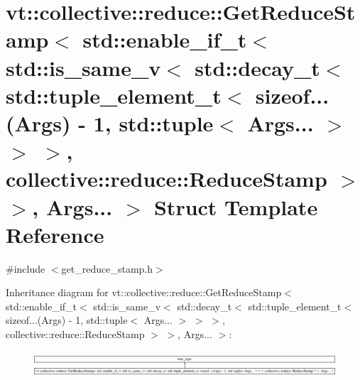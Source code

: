 \hypertarget{structvt_1_1collective_1_1reduce_1_1_get_reduce_stamp_3_01std_1_1enable__if__t_3_01std_1_1is__sa2cf8316b2e34c0a2685c4cd088c88737}{}\section{vt\+:\+:collective\+:\+:reduce\+:\+:Get\+Reduce\+Stamp$<$ std\+:\+:enable\+\_\+if\+\_\+t$<$ std\+:\+:is\+\_\+same\+\_\+v$<$ std\+:\+:decay\+\_\+t$<$ std\+:\+:tuple\+\_\+element\+\_\+t$<$ sizeof...(Args) -\/ 1, std\+:\+:tuple$<$ Args... $>$ $>$ $>$, collective\+:\+:reduce\+:\+:Reduce\+Stamp $>$ $>$, Args... $>$ Struct Template Reference}
\label{structvt_1_1collective_1_1reduce_1_1_get_reduce_stamp_3_01std_1_1enable__if__t_3_01std_1_1is__sa2cf8316b2e34c0a2685c4cd088c88737}


{\ttfamily \#include $<$get\+\_\+reduce\+\_\+stamp.\+h$>$}

Inheritance diagram for vt\+:\+:collective\+:\+:reduce\+:\+:Get\+Reduce\+Stamp$<$ std\+:\+:enable\+\_\+if\+\_\+t$<$ std\+:\+:is\+\_\+same\+\_\+v$<$ std\+:\+:decay\+\_\+t$<$ std\+:\+:tuple\+\_\+element\+\_\+t$<$ sizeof...(Args) -\/ 1, std\+:\+:tuple$<$ Args... $>$ $>$ $>$, collective\+:\+:reduce\+:\+:Reduce\+Stamp $>$ $>$, Args... $>$\+:\begin{figure}[H]
\begin{center}
\leavevmode
\includegraphics[height=0.962199cm]{structvt_1_1collective_1_1reduce_1_1_get_reduce_stamp_3_01std_1_1enable__if__t_3_01std_1_1is__sa2cf8316b2e34c0a2685c4cd088c88737}
\end{center}
\end{figure}
